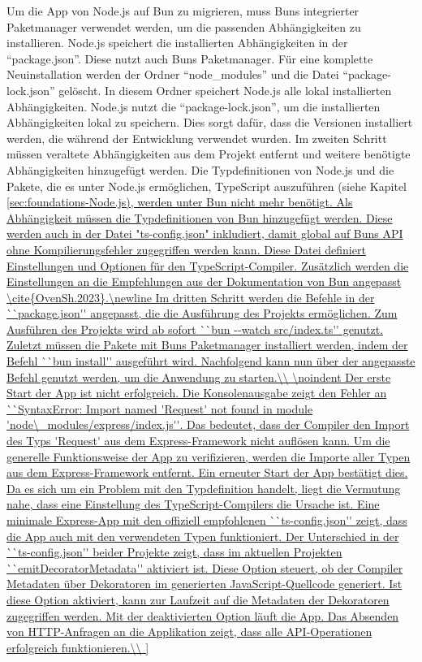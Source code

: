 \noindent
Um die App von Node.js auf Bun zu migrieren, muss Buns integrierter Paketmanager verwendet werden, um die passenden Abhängigkeiten zu installieren. Node.js speichert die installierten Abhängigkeiten in der ``package.json''. Diese nutzt auch Buns Paketmanager. Für eine komplette Neuinstallation werden der Ordner ``node\_modules'' und die Datei ``package-lock.json'' gelöscht. In diesem Ordner speichert Node.js alle lokal installierten Abhängigkeiten. Node.js nutzt die ``package-lock.json'', um die installierten Abhängigkeiten lokal zu speichern. Dies sorgt dafür, dass die Versionen installiert werden, die während der Entwicklung verwendet wurden. \newline
Im zweiten Schritt müssen veraltete Abhängigkeiten aus dem Projekt entfernt und weitere benötigte Abhängigkeiten hinzugefügt werden. Die Typdefinitionen von Node.js und die Pakete, die es unter Node.js ermöglichen, TypeScript auszuführen (siehe Kapitel \ref{sec:foundations-Node.js), werden unter Bun nicht mehr benötigt. Als Abhängigkeit müssen die Typdefinitionen von Bun hinzugefügt werden. Diese werden auch in der Datei "ts-config.json" inkludiert, damit global auf Buns API ohne Kompilierungsfehler zugegriffen werden kann. Diese Datei definiert Einstellungen und Optionen für den TypeScript-Compiler. Zusätzlich werden die Einstellungen an die Empfehlungen aus der Dokumentation von Bun angepasst \cite{OvenSh.2023}.\newline 
Im dritten Schritt werden die Befehle in der ``package.json'' angepasst, die die Ausführung des Projekts ermöglichen. Zum Ausführen des Projekts wird ab sofort ``bun --watch src/index.ts'' genutzt. Zuletzt müssen die Pakete mit Buns Paketmanager installiert werden, indem der Befehl ``bun install'' ausgeführt wird. Nachfolgend kann nun über der angepasste Befehl genutzt werden, um die Anwendung zu starten.\\

\noindent
Der erste Start der App ist nicht erfolgreich. Die Konsolenausgabe zeigt den Fehler an ``SyntaxError: Import named 'Request' not found in module 'node\_modules/express/index.js''. Das bedeutet, dass der Compiler den Import des Typs 'Request' aus dem Express-Framework nicht auflösen kann. Um die generelle Funktionsweise der App zu verifizieren, werden die Importe aller Typen aus dem Express-Framework entfernt. Ein erneuter Start der App bestätigt dies. Da es sich um ein Problem mit den Typdefinition handelt, liegt die Vermutung nahe, dass eine Einstellung des TypeScript-Compilers die Ursache ist. Eine minimale Express-App mit den offiziell empfohlenen ``ts-config.json'' zeigt, dass die App auch mit den verwendeten Typen funktioniert. Der Unterschied in der ``ts-config.json'' beider Projekte zeigt, dass im aktuellen Projekten ``emitDecoratorMetadata'' aktiviert ist. Diese Option steuert, ob der Compiler Metadaten über Dekoratoren im generierten JavaScript-Quellcode generiert. Ist diese Option aktiviert, kann zur Laufzeit auf die Metadaten der Dekoratoren zugegriffen werden. Mit der deaktivierten Option läuft die App. Das Absenden von HTTP-Anfragen an die Applikation zeigt, dass alle API-Operationen erfolgreich funktionieren.\\

}
